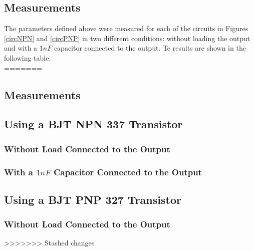 
\subsection{\color{purple}Measurements}

The parameters defined above were measured for each of the circuits in Figures \ref{circNPN} and \ref{circPNP} in two different conditions: without loading the output and with a $1 nF$ capacitor connected to the output. Te results are shown in the following table. \\
=======
\subsection{\color{purple}Measurements}


\subsection{\color{purple}Using a BJT NPN 337 Transistor}

\subsubsection{\color{red}Without Load Connected to the Output}

\subsubsection{\color{red}With a $1 nF$ Capacitor Connected to the Output}


\subsection{\color{purple}Using a BJT PNP 327 Transistor}

\subsubsection{\color{red}Without Load Connected to the Output}

>>>>>>> Stashed changes

